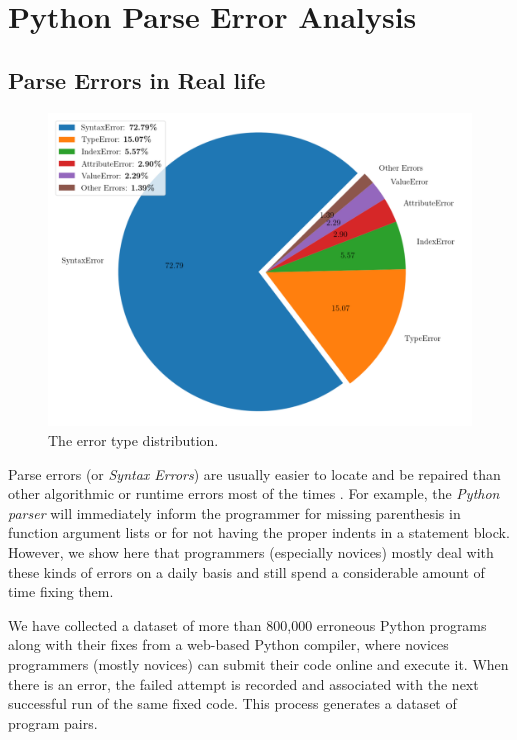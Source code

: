 \section{Python Parse Error Analysis}
\label{sec:error-analysis}

\subsection{Parse Errors in Real life}
\label{sec:error-analysis:syntax}

\begin{figure}[h]
  \centering
  \includegraphics[width=0.8\linewidth]{error-statistics.png}
  \caption{The error type distribution.}
  \label{fig:error-statistics}
\end{figure}

Parse errors (or \emph{Syntax Errors}) are usually easier to locate and be
repaired than other algorithmic or runtime errors most of the times
\citep{Denny_2012}. For example, the \emph{Python parser} will immediately
inform the programmer for missing parenthesis in function argument lists or for
not having the proper indents in a statement block. However, we show here that
programmers (especially novices) mostly deal with these kinds of errors on a
daily basis and still spend a considerable amount of time fixing them.

We have collected a dataset of more than 800,000 erroneous Python programs along
with their fixes from a web-based Python compiler, where novices programmers
(mostly novices) can submit their code online and execute it. When there is an
error, the failed attempt is recorded and associated with the next successful
run of the same fixed code. This process generates a dataset of program pairs.

